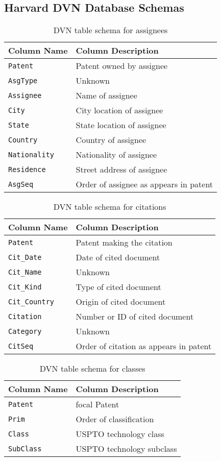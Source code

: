 \subsection*{Harvard DVN Database Schemas}
\begin{table*}
\center
\begin{tabular}{| l | l |}
\hline
Column Name & Column Description \\
\hline
\verb`Patent` & Patent owned by assignee \\
\verb`AsgType` & Unknown \\
\verb`Assignee` & Name of assignee \\
\verb`City` & City location of assignee \\
\verb`State` & State location of assignee \\
\verb`Country` & Country of assignee \\
\verb`Nationality` & Nationality of assignee \\
\verb`Residence` & Street address of assignee \\
\verb`AsgSeq` & Order of assignee as appears in patent \\
\hline
\end{tabular}
\caption{DVN table schema for assignees}
\end{table*}

\begin{table*}
\center
\begin{tabular}{| l | l |}
\hline
Column Name & Column Description \\
\hline
\verb`Patent` & Patent making the citation \\
\verb`Cit_Date` & Date of cited document \\
\verb`Cit_Name` & Unknown \\
\verb`Cit_Kind` & Type of cited document \\
\verb`Cit_Country` & Origin of cited document \\
\verb`Citation` & Number or ID of cited document \\
\verb`Category` & Unknown \\
\verb`CitSeq` & Order of citation as appears in patent \\
\hline
\end{tabular}
\caption{DVN table schema for citations}
\end{table*}

\begin{table*}
\center
\begin{tabular}{| l | l |}
\hline
Column Name & Column Description \\
\hline
\verb`Patent` & focal Patent \\
\verb`Prim` & Order of classification \\
\verb`Class` & USPTO technology class \\
\verb`SubClass` & USPTO technology subclass \\
\hline
\end{tabular}
\caption{DVN table schema for classes}
\end{table*}

